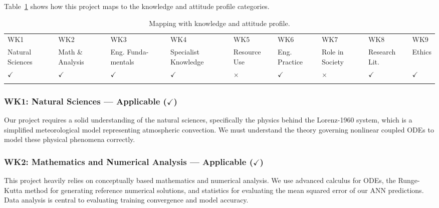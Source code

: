 Table~\ref{tab:k_profile} shows how this project maps to the knowledge and attitude profile categories.

\begin{center}
    \begin{table}[ht]
        \centering
        \caption{Mapping with knowledge and attitude profile.}
        \begin{tabular}{|p{}|p{}|p{}|p{}|p{}|p{}|p{}|p{}|p{}|}
        \hline
        WK1& WK2& WK3& WK4& WK5& WK6& WK7& WK8& WK9\\
        Natural Sciences & Math \& Analysis & Eng. Funda- mentals & Specialist Knowledge & Resource Use & Eng. Practice & Role in Society & Research Lit. & Ethics\\
        \hline 
        $\checkmark$ & $\checkmark$ & $\checkmark$ & $\checkmark$ & $\times$ & $\checkmark$ & $\times$ & $\checkmark$ & $\checkmark$\\
        &&&&&&&&\\
        \hline 
        \end{tabular}
        \label{tab:k_profile}
    \end{table}
\end{center}

\subsubsection{WK1: Natural Sciences --- Applicable ($\checkmark$)}

Our project requires a solid understanding of the natural sciences, specifically the physics behind the Lorenz-1960 system, which is a simplified meteorological model representing atmospheric convection. We must understand the theory governing nonlinear coupled ODEs to model these physical phenomena correctly.

\subsubsection{WK2: Mathematics and Numerical Analysis --- Applicable ($\checkmark$)}

This project heavily relies on conceptually based mathematics and numerical analysis. We use advanced calculus for ODEs, the Runge-Kutta method for generating reference numerical solutions, and statistics for evaluating the mean squared error of our ANN predictions. Data analysis is central to evaluating training convergence and model accuracy.

